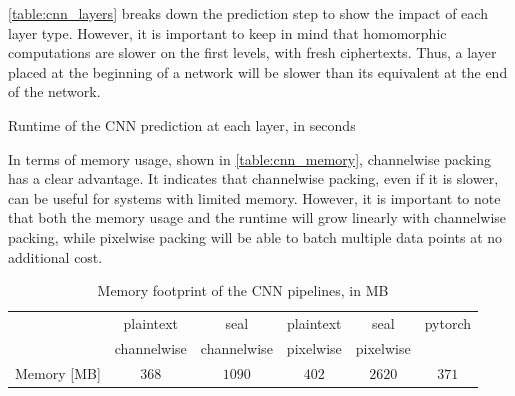 \documentclass[a4paper,11pt,oneside]{report}
\begin{document}
\autoref{table:cnn_layers} breaks down the prediction step to show the impact of each layer type. 
However, it is important to keep in mind that homomorphic computations are slower on the first levels, with fresh ciphertexts. 
Thus, a layer placed at the beginning of a network will be slower than its equivalent at the end of the network.

\begin{table}[h!]
  \begin{center}
    \caption{Runtime of the CNN prediction at each layer, in seconds}
    \label{table:cnn_layers}
  \end{center}
\end{table}

In terms of memory usage, shown in \autoref{table:cnn_memory}, channelwise packing has a clear advantage.
It indicates that channelwise packing, even if it is slower, can be useful for systems with limited memory.
However, it is important to note that both the memory usage and the runtime will grow linearly with channelwise packing, while pixelwise packing will be able to batch multiple data points at no additional cost.

\begin{table}[h!]
  \begin{center}
    \caption{Memory footprint of the CNN pipelines, in MB}
    \label{table:cnn_memory}
    \begin{tabular}{ c c c c c c }
    \hline
    & plaintext & seal & plaintext & seal & pytorch \\
    & channelwise & channelwise & pixelwise & pixelwise & \\
    \hline
    Memory [MB] & $368$ & $1090$ & $402$ & $2620$ & $371$ \\
    \hline
    \end{tabular}
  \end{center}
\end{table}
\end{document}
